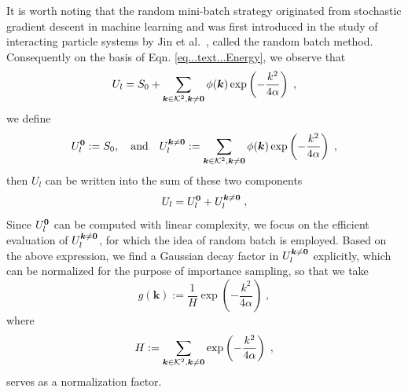 It is worth noting that the random mini-batch strategy originated from stochastic gradient descent in machine learning and was first introduced in the study of interacting particle systems by Jin et al.~\cite{jin2020random}, called the random batch method. Consequently
on the basis of Eqn. \eqref{eq...text...Energy},  we observe that 
\[
U_l =   S_0+ \sum_{\bm{k}\in\mathcal{K}^2,\bm{k}\neq\bm{0}}\phi(\bm{k}) \exp\left(-\frac{k^2}{4\alpha}\right) \;,
\]
we define 
\begin{equation}\label{eq::U_l0_Ulk}
    U_l^{\bm{0}} := S_0,\quad\text{and}\quad U_l^{\bm{k}\neq \bm{0}} :=\sum_{\bm{k}\in\mathcal{K}^2,\bm{k}\neq\bm{0}}\phi(\bm{k}) \exp\left(-\frac{k^2}{4\alpha}\right) \;,
\end{equation}
then $U_l$ can be written into the sum of these two components
\[
U_l= U_l^{\bm{0}}+U_l^{\bm{k}\neq \bm{0}}\;,
\]
Since 
$ U_l^{\bm{0}}$
can be computed with linear complexity, we focus on the efficient evaluation of 
$U_l^{\bm{k}\neq \bm{0}}$, for which the idea of random batch is employed.
Based on the above expression, we find a Gaussian decay factor in $U_l^{\bm{k}\neq \bm{0}}$ explicitly, which can be normalized for the  purpose of importance sampling, so that we take
\begin{equation}\label{eq::hk}
	g(\bm{k}) := \frac{1}{H} \exp\left(-\frac{k^2}{4\alpha}\right)\;, %
\end{equation}
where \[H:= \sum_{\bm{k}\in\mathcal{K}^2,\bm{k}\neq\bm{0}}\exp\left(-\frac{k^2}{4\alpha}\right)\;,\] serves as a normalization factor.
